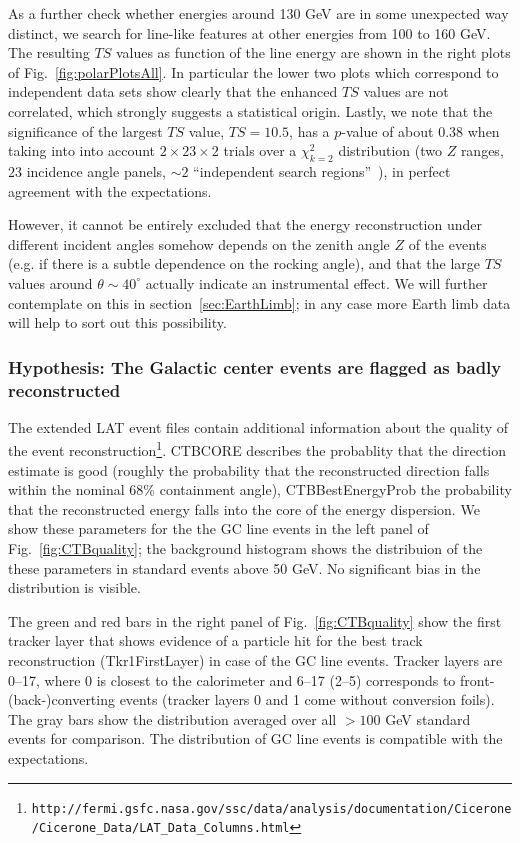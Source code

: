 \documentclass[aps,twocolumn,prd,superscriptaddress,showpacs,nofootinbib,fixfloat]{revtex4}
\begin{document}
As a further check whether energies around 130 GeV are in some unexpected way
distinct, we search for line-like features at other energies from 100 to 160
GeV. The resulting $TS$ values as function of the line energy are shown in the
right plots of Fig.~\ref{fig:polarPlotsAll}. In particular the lower two plots
which correspond to independent data sets show clearly that the enhanced $TS$
values are not correlated, which strongly suggests a statistical origin.
Lastly, we note that the significance of the largest $TS$ value, $TS=10.5$,
has a $p$-value of about $0.38$ when taking into into account
$2\times23\times2$ trials over a $\chi_{k=2}^2$ distribution (two $Z$ ranges,
$23$ incidence angle panels, $\sim2$ ``independent search
regions''~\cite{Vittels}), in perfect agreement with the expectations.

However, it cannot be entirely excluded that the energy reconstruction under
different incident angles somehow depends on the zenith angle $Z$ of the
events (e.g. if there is a subtle dependence on the rocking angle), and that
the large $TS$ values around $\theta\sim40^\circ$ actually indicate an
instrumental effect. We will further contemplate on this in
section~\ref{sec:EarthLimb}; in any case more Earth limb data will help to
sort out this possibility.

\subsubsection{Hypothesis: The Galactic center events are flagged as badly
reconstructed}

The extended LAT event files contain additional information
about the quality of the event
reconstruction\footnote{\texttt{http://fermi.gsfc.nasa.gov/ssc/data/analysis/documentation/Cicerone/Cicerone\_Data/LAT\_Data\_Columns.html}}. CTBCORE
describes the probablity that the direction estimate is good
(roughly the probability that the reconstructed direction
falls within the nominal 68\% containment angle),
CTBBestEnergyProb the probability that the reconstructed
energy falls into the core of the energy dispersion. We show
these parameters for the the GC line events in the left
panel of Fig.~\ref{fig:CTBquality}; the background histogram
shows the distribuion of the these parameters in standard
events above 50 GeV. No significant bias in the distribution
is visible.

The green and red bars in the right panel of Fig.~\ref{fig:CTBquality} show
the first tracker layer that shows evidence of a particle hit for the best
track reconstruction (Tkr1FirstLayer) in case of the GC line events.  Tracker
layers are 0--17, where 0 is closest to the calorimeter and 6--17 (2--5)
corresponds to front- (back-)converting events (tracker layers 0 and 1 come
without conversion foils). The gray bars show the distribution averaged over
all $>100$ GeV standard events for comparison. The distribution of GC line
events is compatible with the expectations.
\end{document}
